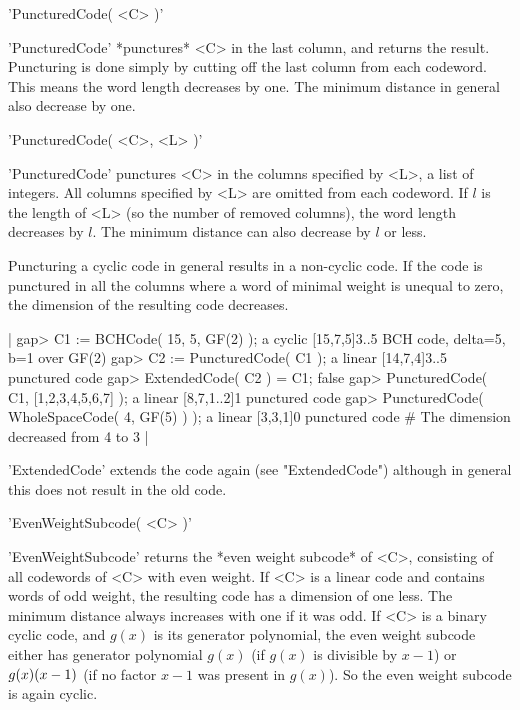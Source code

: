 
'PuncturedCode( <C> )'

'PuncturedCode'  *punctures*  <C> in  the  last column,   and returns the
result. Puncturing  is done simply  by cutting  off the last  column from
each codeword. This means  the word length  decreases by one. The minimum
distance in general also decrease by one.

'PuncturedCode( <C>, <L> )'

'PuncturedCode' punctures <C> in the columns specified  by <L>, a list of
integers.  All columns specified by  <L> are  omitted from each codeword.
If $l$ is the length of <L> (so the number of  removed columns), the word
length decreases by $l$. The minimum distance can also decrease by $l$ or
less.

Puncturing a cyclic code in general results in  a non-cyclic code. If the
code is  punctured in all the  columns where a  word of minimal weight is
unequal to zero, the dimension of the resulting code decreases.

|    gap> C1 := BCHCode( 15, 5, GF(2) );
    a cyclic [15,7,5]3..5 BCH code, delta=5, b=1 over GF(2)
    gap> C2 := PuncturedCode( C1 );
    a linear [14,7,4]3..5 punctured code
    gap> ExtendedCode( C2 ) = C1;
    false
    gap> PuncturedCode( C1, [1,2,3,4,5,6,7] );
    a linear [8,7,1..2]1 punctured code
    gap> PuncturedCode( WholeSpaceCode( 4, GF(5) ) );
    a linear [3,3,1]0 punctured code  # The dimension decreased from 4 to 3 |

'ExtendedCode' extends the  code  again (see "ExtendedCode")  although in
general this does not result in the old code.


'EvenWeightSubcode( <C> )'

'EvenWeightSubcode' returns the *even  weight subcode* of <C>, consisting
of all  codewords of <C> with even  weight. If <C>  is  a linear code and
contains words of  odd weight, the resulting code  has a dimension of one
less.  The minimum distance  always increases with one  if it was odd. If
<C> is a binary cyclic code, and $g(x)$  is its generator polynomial, the
even weight subcode either has  generator polynomial $g(x)$ (if $g(x)$ is
divisible by  $x-1$) or $g(x)\*(x-1)$ (if no  factor $x-1$ was present in
$g(x)$). So the even weight subcode is again cyclic.

